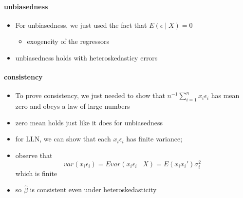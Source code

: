\paragraph{unbiasedness}
\begin{itemize}
\item For unbiasedness, we just used the fact that $E(\epsilon \mid
        X) = 0$
\begin{itemize}
\item exogeneity of the regressors
\end{itemize}
\item unbiasedness holds with heteroskedasticy errors
\end{itemize}

\paragraph{consistency}
\begin{itemize}
\item To prove consistency, we just needed to show that
        $n^{-1}\sum_{i=1}^n x_i \epsilon_i$ has mean zero and obeys a
        law of large numbers
\item zero mean holds just like it does for unbiasedness
\item for LLN, we can show that each $x_i \epsilon_i$ has finite
        variance;
\item observe that
        \[var(x_i \epsilon_i) = E var(x_i \epsilon_i \mid X) = E(x_i
        x_i') \sigma_i^2\]
        which is finite
\item so $\hat\beta$ is consistent even under heteroskedasticity
\end{itemize}

